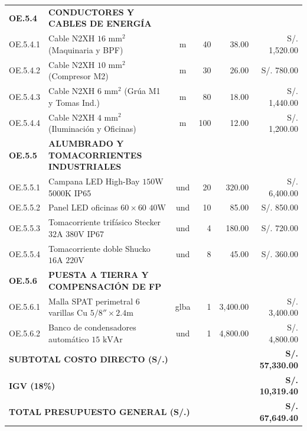 \begin{table}[H]
{\begin{tabular}{llcrrr}
\midrule
\textbf{OE.5.4} & \textbf{CONDUCTORES Y CABLES DE ENERGÍA} & & & & \\
OE.5.4.1 & Cable N2XH $16\text{ mm}^2$ (Maquinaria y BPF) & m & 40 & 38.00 & S/. 1,520.00 \\
OE.5.4.2 & Cable N2XH $10\text{ mm}^2$ (Compresor M2) & m & 30 & 26.00 & S/. 780.00 \\
OE.5.4.3 & Cable N2XH $6\text{ mm}^2$ (Grúa M1 y Tomas Ind.) & m & 80 & 18.00 & S/. 1,440.00 \\
OE.5.4.4 & Cable N2XH $4\text{ mm}^2$ (Iluminación y Oficinas) & m & 100 & 12.00 & S/. 1,200.00 \\
\midrule
\textbf{OE.5.5} & \textbf{ALUMBRADO Y TOMACORRIENTES INDUSTRIALES} & & & & \\
OE.5.5.1 & Campana LED High-Bay $150\text{W}$ 5000K IP65 & und & 20 & 320.00 & S/. 6,400.00 \\
OE.5.5.2 & Panel LED oficinas $60 \times 60$ $40\text{W}$ & und & 10 & 85.00 & S/. 850.00 \\
OE.5.5.3 & Tomacorriente trifásico Stecker $32\text{A}$ $380\text{V}$ IP67 & und & 4 & 180.00 & S/. 720.00 \\
OE.5.5.4 & Tomacorriente doble Shucko $16\text{A}$ $220\text{V}$ & und & 8 & 45.00 & S/. 360.00 \\
\midrule
\textbf{OE.5.6} & \textbf{PUESTA A TIERRA Y COMPENSACIÓN DE FP} & & & & \\
OE.5.6.1 & Malla SPAT perimetral 6 varillas Cu $5/8'' \times 2.4\text{m}$ & glba & 1 & 3,400.00 & S/. 3,400.00 \\
OE.5.6.2 & Banco de condensadores automático $15\text{ kVAr}$ & und & 1 & 4,800.00 & S/. 4,800.00 \\
\midrule
\multicolumn{5}{l}{\textbf{SUBTOTAL COSTO DIRECTO (S/.)}} & \textbf{S/. 57,330.00} \\
\multicolumn{5}{l}{\textbf{IGV (18\%)}} & \textbf{S/. 10,319.40} \\
\multicolumn{5}{l}{\textbf{TOTAL PRESUPUESTO GENERAL (S/.)}} & \textbf{S/. 67,649.40} \\
\bottomrule
\end{tabular}%
}
\end{table}
